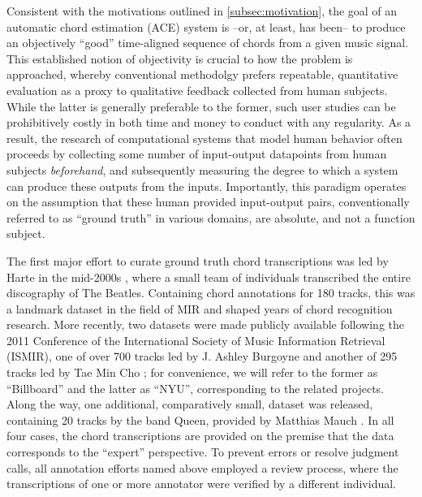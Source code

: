 Consistent with the motivations outlined in \ref{subsec:motivation}, the goal of an automatic chord estimation (ACE) system is --or, at least, has been-- to produce an objectively ``good'' time-aligned sequence of chords from a given music signal.
This established notion of objectivity is crucial to how the problem is approached, whereby conventional methodolgy prefers repeatable, quantitative evaluation as a proxy to qualitative feedback collected from human subjects.
While the latter is generally preferable to the former, such user studies can be prohibitively costly in both time and money to conduct with any regularity.
As a result, the research of computational systems that model human behavior often proceeds by collecting some number of input-output datapoints from human subjects \emph{beforehand}, and subsequently measuring the degree to which a system can produce these outputs from the inputs.
Importantly, this paradigm operates on the assumption that these human provided input-output pairs, conventionally referred to as ``ground truth'' in various domains, are absolute, and not a function subject.

The first major effort to curate ground truth chord transcriptions was led by Harte in the mid-2000s \cite{Isophonics}, where a small team of individuals transcribed the entire discography of The Beatles.
Containing chord annotations for 180 tracks, this was a landmark dataset in the field of MIR and shaped years of chord recognition research.
More recently, two datasets were made publicly available following the 2011 Conference of the International Society of Music Information Retrieval (ISMIR), one of over 700 tracks led by J. Ashley Burgoyne \cite{Burgoyne2011} and another of 295 tracks led by Tae Min Cho \cite{Cho2011b}; for convenience, we will refer to the former as ``Billboard'' and the latter as ``NYU'', corresponding to the related projects.
Along the way, one additional, comparatively small, dataset was released, containing 20 tracks by the band Queen, provided by Matthias Mauch \cite{Mauch2009x}.
In all four cases, the chord transcriptions are provided on the premise that the data corresponds to the ``expert'' perspective.
To prevent errors or resolve judgment calls, all annotation efforts named above employed a review process, where the transcriptions of one or more annotator were verified by a different individual.


